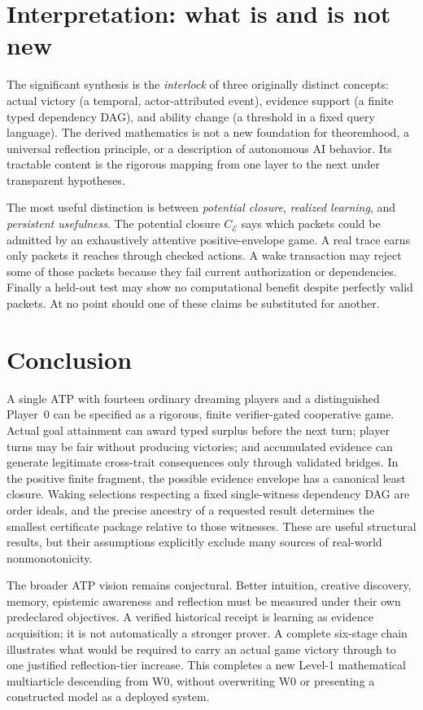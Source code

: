 \documentclass[11pt,letterpaper]{article}
\newcommand{\calE}{\mathcal E}
\begin{document}
\section{Interpretation: what is and is not new}\label{gl-first-W1-s11}
The significant synthesis is the \emph{interlock} of three originally distinct concepts: actual victory (a temporal, actor-attributed event), evidence support (a finite typed dependency DAG), and ability change (a threshold in a fixed query language). The derived mathematics is not a new foundation for theoremhood, a universal reflection principle, or a description of autonomous AI behavior. Its tractable content is the rigorous mapping from one layer to the next under transparent hypotheses.

The most useful distinction is between \emph{potential closure}, \emph{realized learning}, and \emph{persistent usefulness}. The potential closure $C_{\calE}$ says which packets could be admitted by an exhaustively attentive positive-envelope game. A real trace earns only packets it reaches through checked actions. A wake transaction may reject some of those packets because they fail current authorization or dependencies. Finally a held-out test may show no computational benefit despite perfectly valid packets. At no point should one of these claims be substituted for another.

\section{Conclusion}\label{gl-first-W1-s12}
A single ATP with fourteen ordinary dreaming players and a distinguished Player~0 can be specified as a rigorous, finite verifier-gated cooperative game. Actual goal attainment can award typed surplus before the next turn; player turns may be fair without producing victories; and accumulated evidence can generate legitimate cross-trait consequences only through validated bridges. In the positive finite fragment, the possible evidence envelope has a canonical least closure. Waking selections respecting a fixed single-witness dependency DAG are order ideals, and the precise ancestry of a requested result determines the smallest certificate package relative to those witnesses. These are useful structural results, but their assumptions explicitly exclude many sources of real-world nonmonotonicity.

The broader ATP vision remains conjectural. Better intuition, creative discovery, memory, epistemic awareness and reflection must be measured under their own predeclared objectives. A verified historical receipt is learning as evidence acquisition; it is not automatically a stronger prover. A complete six-stage chain illustrates what would be required to carry an actual game victory through to one justified reflection-tier increase. This completes a new Level-1 mathematical multiarticle descending from W0, without overwriting W0 or presenting a constructed model as a deployed system.
\end{document}
